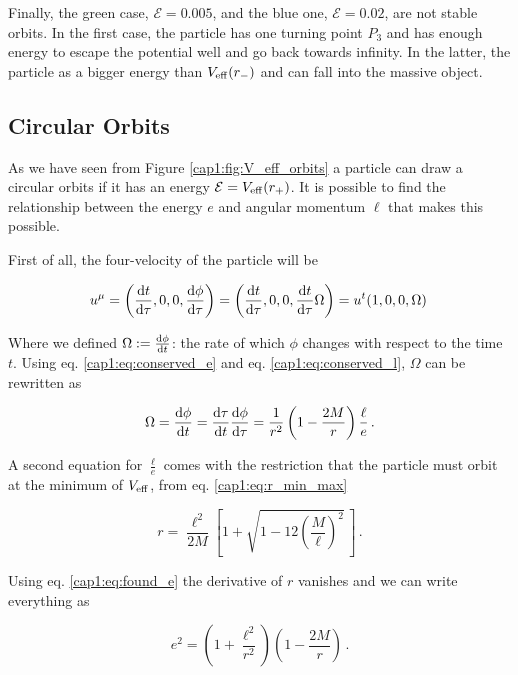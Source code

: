 Finally, the green case, $\mathcal E = 0.005$, and the blue one,
$\mathcal E = 0.02$, are not stable orbits.
In the first case, the particle has one turning point $P_3$ and has enough
energy to escape the potential well and go back towards infinity.
In the latter, the particle as a bigger energy than $V_{\rm eff} (r_-)$
and can fall into the massive object.


\subsection{Circular Orbits}
\label{cap1:ssec:circular_orbits}

As we have seen from Figure \ref{cap1:fig:V_eff_orbits} a particle can draw a
circular orbits if it has an energy $\mathcal E = V_{\rm eff}(r_+)$.
It is possible to find the relationship between the energy $e$
and angular momentum $\ell$ that makes this possible.

First of all, the four-velocity of the particle will be

\begin{equation}
    u^\mu = \left(\dv{t}{\tau}, 0, 0, \dv{\phi}{\tau} \right)
    = \left(\dv{t}{\tau}, 0, 0, \dv{t}{\tau} \Omega \right)
    = u^t (1, 0, 0, \Omega) \,
    \label{cap1:eq:circular_orbit_u}
\end{equation}

Where we defined $\Omega := \dv{\phi}{t}$: the rate of which $\phi$ changes with
respect to the \Sh time $t$.
Using eq. \ref{cap1:eq:conserved_e} and eq. \ref{cap1:eq:conserved_l}, $\Omega$
can be rewritten as

\begin{equation}
    \Omega = \dv{\phi}{t} = \dv{\tau}{t} \dv{\phi}{\tau} =
    \frac{1}{r^2} \left(1 - \frac{2M}{r} \right) \frac{\ell}{e}\, .
    \label{cap1:eq:Omega}
\end{equation}

A second equation for $\frac{\ell}{e}$ comes with the restriction that the
particle must orbit at the minimum of $V_{\rm eff}$, from eq.
\ref{cap1:eq:r_min_max}

\begin{equation}
    r = \frac{\ell^2}{2 M} \left[1 +
    \sqrt{1 - 12 \left( \frac{M}{\ell} \right)^2} \, \right] \, .
    \label{cap1:eq:r_min}
\end{equation}

Using eq. \ref{cap1:eq:found_e} the derivative of $r$ vanishes
and we can write everything as

\begin{equation}
    e^2 = \left(1 + \frac{\ell^2}{r^2} \right)
    \left(1 - \frac{2M}{r}\right) \, .
    \label{cap1:eq:circular_orbit1}
\end{equation}

